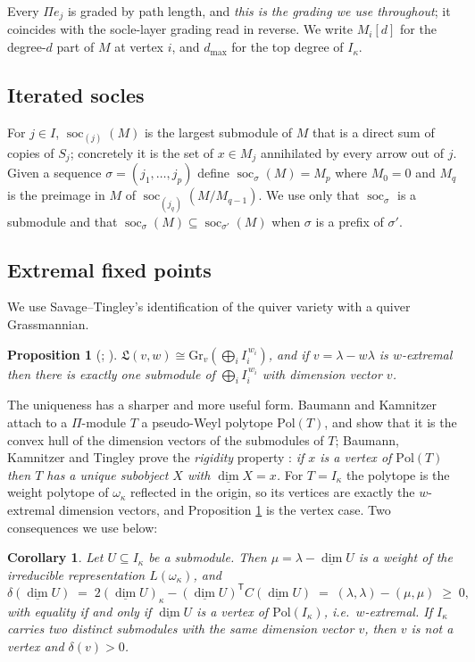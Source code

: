 \documentclass[11pt,reqno]{amsart}
\theoremstyle{plain}
\newtheorem{proposition}[theorem]{Proposition}
\newtheorem{corollary}[theorem]{Corollary}
\theoremstyle{definition}
\DeclareMathOperator{\soc}{soc}
\newcommand{\Pia}{\Pi}
\newcommand{\dimv}{\underline{\dim}}
\newcommand{\om}{\omega}
\newcommand{\la}{\lambda}
\newcommand{\ka}{\kappa}
\begin{document}
Every $\Pia e_j$ is graded by path length, and \emph{this is the grading we
use throughout}; it coincides with the socle-layer grading read in reverse.  We
write $M_i[d]$ for the degree-$d$ part of $M$ at vertex $i$, and $d_{\max}$ for
the top degree of $I_\ka$.

\subsection{Iterated socles}
For $j\in I$, $\soc_{(j)}(M)$ is the largest submodule of $M$ that is a direct
sum of copies of $S_j$; concretely it is the set of $x\in M_j$ annihilated by
every arrow out of $j$.  Given a sequence $\sigma=(j_1,\dots,j_p)$ define
$\soc_\sigma(M)=M_p$ where $M_0=0$ and $M_q$ is the preimage in $M$ of
$\soc_{(j_q)}(M/M_{q-1})$.  We use only that $\soc_\sigma$ is a submodule and
that $\soc_{\sigma}(M)\subseteq\soc_{\sigma'}(M)$ when $\sigma$ is a prefix of
$\sigma'$.

\subsection{Extremal fixed points}
We use Savage--Tingley's identification of the quiver variety with a quiver
Grassmannian.

\begin{proposition}[{\cite[Thm.~4.4, Prop.~4.9]{ST}; \cite{BK,BKT}}]\label{prop:ST}
$\mathfrak{L}(v,w)\cong\mathrm{Gr}_{v}\!\left(\bigoplus_i I_i^{\,w_i}\right)$,
and if $v=\la-w\la$ is $w$-extremal then there is exactly one submodule of
$\bigoplus_i I_i^{\,w_i}$ with dimension vector $v$.
\end{proposition}

The uniqueness has a sharper and more useful form.  Baumann and Kamnitzer
attach to a $\Pia$-module $T$ a pseudo-Weyl polytope $\mathrm{Pol}(T)$, and
show \cite{BK} that it is the convex hull of the dimension vectors of the
submodules of $T$; Baumann, Kamnitzer and Tingley prove the \emph{rigidity}
property \cite[\S3.1]{BKT}: \emph{if $x$ is a vertex of $\mathrm{Pol}(T)$ then
$T$ has a unique subobject $X$ with $\dimv X=x$.}  For $T=I_\ka$ the polytope
is the weight polytope of $\om_\ka$ reflected in the origin, so its vertices
are exactly the $w$-extremal dimension vectors, and Proposition \ref{prop:ST}
is the vertex case.  Two consequences we use below:

\begin{corollary}\label{cor:pol}
Let $U\subseteq I_\ka$ be a submodule.  Then $\mu=\la-\dimv U$ is a weight of
the irreducible representation $L(\om_\ka)$, and
\[
   \delta(\dimv U)\;=\;2(\dimv U)_\ka-(\dimv U)^{\mathsf T}C(\dimv U)
   \;=\;(\la,\la)-(\mu,\mu)\;\ge\;0,
\]
with equality if and only if $\dimv U$ is a vertex of $\mathrm{Pol}(I_\ka)$,
i.e.\ $w$-extremal.  If $I_\ka$ carries two distinct submodules with the same
dimension vector $v$, then $v$ is not a vertex and $\delta(v)>0$.
\end{corollary}
\end{document}
